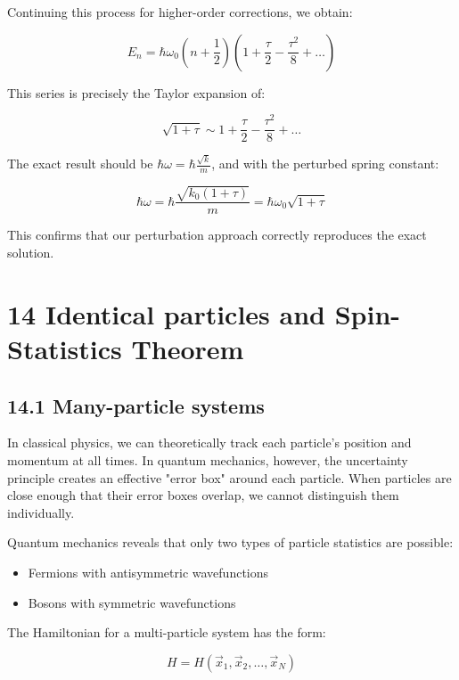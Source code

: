 \documentclass[italian]{HKNdocument}
\begin{document}
Continuing this process for higher-order corrections, we obtain:

\begin{equation*}
E_n=\hbar\omega_0(n+\frac{1}{2})(1+\frac{\tau}{2}-\frac{\tau^2}{8}+\ldots) \tag{13.28}
\end{equation*}

This series is precisely the Taylor expansion of:

\begin{equation*}
\sqrt{1+\tau}\sim 1+\frac{\tau}{2}-\frac{\tau^2}{8}+\ldots \tag{13.29}
\end{equation*}

The exact result should be $\hbar\omega=\hbar\frac{\sqrt{k}}{m}$, and with the perturbed spring constant:

\begin{equation*}
\hbar\omega=\hbar\frac{\sqrt{k_0(1+\tau)}}{m}=\hbar\omega_0\sqrt{1+\tau} \tag{13.30}
\end{equation*}

This confirms that our perturbation approach correctly reproduces the exact solution.

\section*{14 Identical particles and Spin-Statistics Theorem}
\subsection*{14.1 Many-particle systems}
In classical physics, we can theoretically track each particle's position and momentum at all times. In quantum mechanics, however, the uncertainty principle creates an effective "error box" around each particle. When particles are close enough that their error boxes overlap, we cannot distinguish them individually.

Quantum mechanics reveals that only two types of particle statistics are possible:
\begin{itemize}
  \item Fermions with antisymmetric wavefunctions
  \item Bosons with symmetric wavefunctions
\end{itemize}

The Hamiltonian for a multi-particle system has the form:

\begin{equation*}
H=H(\vec{x}_1,\vec{x}_2,\ldots,\vec{x}_N) \tag{14.1}
\end{equation*}
\end{document}

